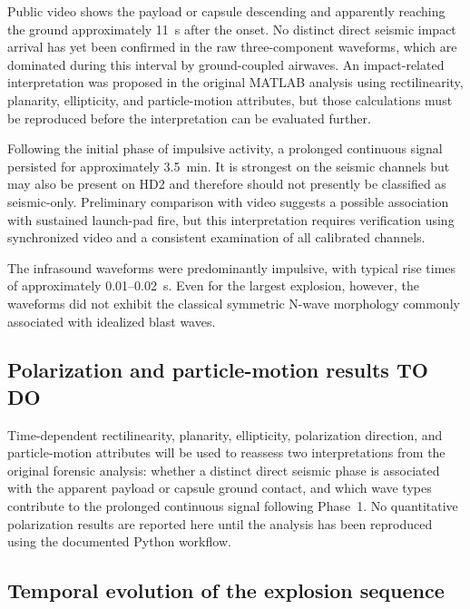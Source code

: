 \documentclass[]{seismica}
\begin{document}
Public video shows the payload or capsule descending and apparently reaching
the ground approximately 11~s after the onset. No distinct direct seismic
impact arrival has yet been confirmed in the raw three-component waveforms,
which are dominated during this interval by ground-coupled airwaves. An
impact-related interpretation was proposed in the original MATLAB analysis
using rectilinearity, planarity, ellipticity, and particle-motion attributes,
but those calculations must be reproduced before the interpretation can be
evaluated further.

Following the initial phase of impulsive activity, a prolonged continuous
signal persisted for approximately 3.5~min. It is strongest on the seismic
channels but may also be present on HD2 and therefore should not presently be
classified as seismic-only. Preliminary comparison with video suggests a
possible association with sustained launch-pad fire, but this interpretation
requires verification using synchronized video and a consistent examination of
all calibrated channels.

The infrasound waveforms were predominantly impulsive, with typical rise times of approximately 0.01--0.02~s. Even for the largest explosion, however, the waveforms did not exhibit the classical symmetric N-wave morphology commonly associated with idealized blast waves.

\subsection{Polarization and particle-motion results TO DO}
\label{sec:results_polarization}

Time-dependent rectilinearity, planarity, ellipticity, polarization direction,
and particle-motion attributes will be used to reassess two interpretations
from the original forensic analysis: whether a distinct direct seismic phase
is associated with the apparent payload or capsule ground contact, and which
wave types contribute to the prolonged continuous signal following Phase~1.
No quantitative polarization results are reported here until the analysis has
been reproduced using the documented Python workflow.

\subsection{Temporal evolution of the explosion sequence}
\label{sec:results_temporal}
\end{document}
